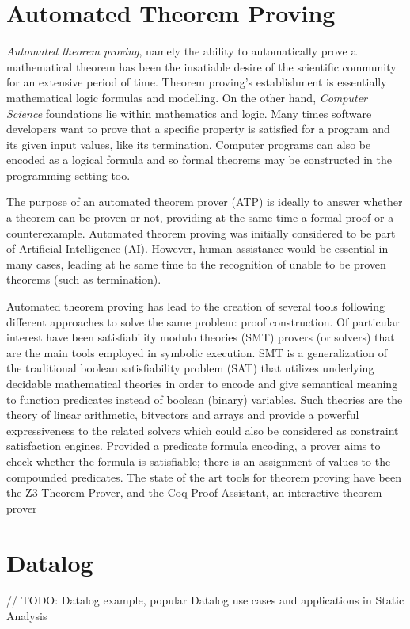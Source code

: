 \section{Automated Theorem Proving}

\textit{Automated theorem proving}, namely the ability to automatically prove a
mathematical theorem has been the insatiable desire of the scientific
community for an extensive period of time. Theorem proving's establishment
is essentially mathematical logic formulas and modelling. On the other hand,
\textit{Computer Science} foundations lie within mathematics and logic.
Many times software developers want to prove that a specific property is satisfied
for a program and its given input values, like its termination. Computer
programs can also be encoded as a logical formula and so formal theorems may be
constructed in the programming setting too.

The purpose of an automated theorem prover (ATP) is ideally to answer whether a
theorem can be proven or not, providing at the same time a formal proof
or a counterexample. Automated theorem proving was initially considered to be
part of Artificial Intelligence (AI). However, human assistance would be essential
in many cases, leading at he same time to the recognition of unable to be proven
theorems (such as termination).

Automated theorem proving has lead to the creation of several tools following
different approaches to solve the same problem: proof construction. Of particular
interest have been satisfiability modulo theories (SMT) provers (or solvers)
that are the main tools employed in symbolic execution. SMT is a generalization
of the traditional boolean satisfiability problem (SAT) that utilizes underlying
decidable mathematical theories in order to encode and give semantical
meaning to function predicates instead of boolean (binary) variables. Such theories
are the theory of linear arithmetic, bitvectors and arrays and provide a powerful
expressiveness to the related solvers which could also be considered as
constraint satisfaction engines. Provided a predicate formula encoding, a prover
aims to check whether the formula is satisfiable; there is an assignment of values
to the compounded predicates. The state of the art tools for theorem proving 
have been the Z3 Theorem Prover\cite{de2008z3}, and the Coq Proof
Assistant\cite{Coq}, an interactive theorem prover

\section{Datalog}

// TODO: Datalog example, popular Datalog use cases and applications in Static Analysis


